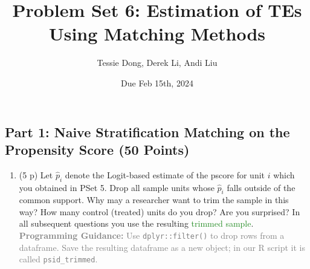\documentclass[
]{article}
\title{Problem Set 6: Estimation of TEs Using Matching Methods}
\author{Tessie Dong, Derek Li, Andi Liu}
\date{Due Feb 15th, 2024}
\providecommand{\tightlist}{%
  \setlength{\itemsep}{0pt}\setlength{\parskip}{0pt}}
\begin{document}
\maketitle



\newpage

\subsection{Part 1: Naive Stratification Matching on the Propensity
Score (50
Points)}\label{part-1-naive-stratification-matching-on-the-propensity-score-50-points}



\begin{enumerate}
\def\labelenumi{\arabic{enumi}.}
\tightlist
\item
  (5 p) Let \(\widehat{p}_i\) denote the Logit-based estimate of the
  pscore for unit \(i\) which you obtained in PSet 5. Drop all sample
  units whose \(\widehat{p}_{i}\) falls outside of the common support.
  Why may a researcher want to trim the sample in this way? How many
  control (treated) units do you drop? Are you surprised? In all
  subsequent questions you use the resulting
  \textcolor{ForestGreen}{trimmed sample}.
  \textcolor{gray}{\textbf{Programming Guidance:} Use \texttt{dplyr::filter()} to drop rows from a dataframe. Save the resulting dataframe as a new object; in our R script it is called \texttt{psid\_trimmed}.}\label{item:pscore-trim}
\end{enumerate}
\end{document}
